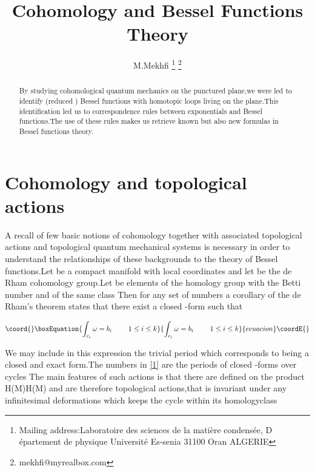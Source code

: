 \documentclass[a4paper,11pt]{article}
\begin{document}
\author{M.Mekhfi \thanks{%
Mailing address:Laboratoire des sciences de la mati\`{e}re condens\'{e}e, D%
\'{e}partement de physique {}Universit\'{e} Es-senia 31100 Oran ALGERIE} 
\thanks{{\footnotesize mekhfi@myrealbox.com}}}
\title{Cohomology and Bessel Functions Theory}
\maketitle

\begin{abstract}
By studying cohomological quantum mechanics on the punctured plane,we were
led to identify (reduced ) Bessel functions with homotopic loops living on
the plane.This identification led us to correspondence rules between
exponentials and Bessel functions.The use of these rules makes us retrieve
known but also new formulas in Bessel functions theory.
\end{abstract}

\section{Cohomology and topological actions}

A recall of few basic notions of cohomology together with associated
topological actions and topological quantum mechanical systems is necessary
in order to understand the relationships of these backgrounds to the theory
of Bessel functions.Let \coordHE{} be a compact manifold with local coordinates \coordHE{} and let \coordHE{} be the \coordHE{} de Rham cohomology group.Let \coordHE{} be elements of the homology group \coordHE{} with \coordHE{}
the \coordHE{} Betti number and of the same class \coordHE{}Then for
any set of numbers \coordHE{} a corollary of the de Rham's theorem
states that there exist a closed \coordHE{}-form \myHighlight{$\omega $}\coordHE{} such that

\begin{equation}\coord{}\boxEquation{
\int_{c_{i}}\omega =b_{i} \textrm{ \qquad }1\leq i\leq k  \label{1}
}{
\int_{c_{i}}\omega =b_{i} \textrm{ \qquad }1\leq i\leq k  }{ecuacion}\coordE{}\end{equation}

We may include in this expression the trivial period \coordHE{} which
corresponds to \myHighlight{$\omega $}\coordHE{} being a closed and exact form.The numbers in \ref{1}
are the periods of closed \coordHE{}-forms over cycles \coordHE{}The main features of
such actions is that there are defined on the product H\coordHE{}(M)\myHighlight{$\times $}\coordHE{}H\coordHE{}(M) and are therefore topological actions,that is invariant under any
infinitesimal deformations which keeps the cycle within its homologyclass \coordHE{}
\end{document}
